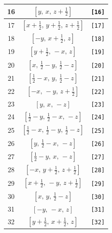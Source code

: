\documentclass[fleqn,8pt]{jsarticle}
\begin{document}
\begin{longtable}{ccc}
16 & $\left[ y,\, x,\, z + \frac{1}{2} \right]$ & {\tt [16]} \\ \hline
17 & $\left[ x + \frac{1}{2},\, y + \frac{1}{2},\, z + \frac{1}{2} \right]$ & {\tt [17]} \\ \hline
18 & $\left[ - y,\, x + \frac{1}{2},\, z \right]$ & {\tt [18]} \\ \hline
19 & $\left[ y + \frac{1}{2},\, - x,\, z \right]$ & {\tt [19]} \\ \hline
20 & $\left[ x,\, \frac{1}{2} - y,\, \frac{1}{2} - z \right]$ & {\tt [20]} \\ \hline
21 & $\left[ \frac{1}{2} - x,\, y,\, \frac{1}{2} - z \right]$ & {\tt [21]} \\ \hline
22 & $\left[ - x,\, - y,\, z + \frac{1}{2} \right]$ & {\tt [22]} \\ \hline
23 & $\left[ y,\, x,\, - z \right]$ & {\tt [23]} \\ \hline
24 & $\left[ \frac{1}{2} - y,\, \frac{1}{2} - x,\, - z \right]$ & {\tt [24]} \\ \hline
25 & $\left[ \frac{1}{2} - x,\, \frac{1}{2} - y,\, \frac{1}{2} - z \right]$ & {\tt [25]} \\ \hline
26 & $\left[ y,\, \frac{1}{2} - x,\, - z \right]$ & {\tt [26]} \\ \hline
27 & $\left[ \frac{1}{2} - y,\, x,\, - z \right]$ & {\tt [27]} \\ \hline
28 & $\left[ - x,\, y + \frac{1}{2},\, z + \frac{1}{2} \right]$ & {\tt [28]} \\ \hline
29 & $\left[ x + \frac{1}{2},\, - y,\, z + \frac{1}{2} \right]$ & {\tt [29]} \\ \hline
30 & $\left[ x,\, y,\, \frac{1}{2} - z \right]$ & {\tt [30]} \\ \hline
31 & $\left[ - y,\, - x,\, z \right]$ & {\tt [31]} \\ \hline
32 & $\left[ y + \frac{1}{2},\, x + \frac{1}{2},\, z \right]$ & {\tt [32]} \\
\end{longtable}
\end{document}

